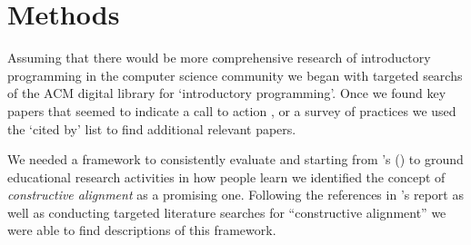 \documentclass[12pt]{article}
\let\textcite=\autocite
\begin{document}


\section{Methods}
Assuming that there would be more comprehensive research of
introductory programming in the computer science community we began
with targeted searchs of the ACM digital library for `introductory
programming'. Once we found key papers that seemed to indicate a call
to action
\autocite[e.g.][]{mccracken_multinational_2001,kolling_problem_1999},
or a survey of practices
\autocite[e.g.][]{pears_survey_2007-1,robins_learning_2003} we used
the `cited by' list to find additional relevant papers.

We needed a framework to consistently evaluate and starting from
\citeauthor{jamieson_creating_2009}'s
(\citeyear{jamieson_creating_2009}) to ground educational research
activities in how people learn we identified the concept of
\emph{constructive alignment} as a promising one. Following the
references in \citeauthor{jamieson_creating_2009}'s report as well as
conducting targeted literature searches for ``constructive alignment''
we were able to find descriptions of this
framework\autocite{jamieson_creating_2009,pellegrino_rethinking_2006,felder_designing_2003,biggs_enhancing_1996}.


\end{document}
